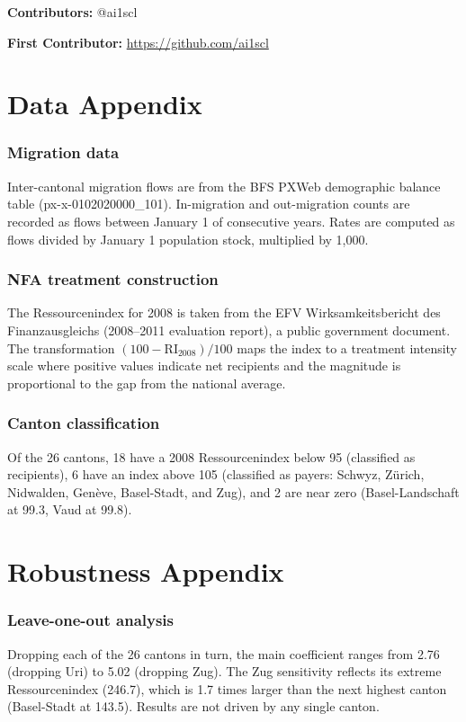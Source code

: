 \documentclass[12pt]{article}
\begin{document}
\noindent\textbf{Contributors:} @ai1scl

\noindent\textbf{First Contributor:} \url{https://github.com/ai1scl}

\label{apep_main_text_end}
\newpage


\newpage
\appendix

\section{Data Appendix}

\subsubsection*{Migration data} Inter-cantonal migration flows are from the BFS PXWeb demographic balance table (px-x-0102020000\_101). In-migration and out-migration counts are recorded as flows between January 1 of consecutive years. Rates are computed as flows divided by January 1 population stock, multiplied by 1,000.

\subsubsection*{NFA treatment construction} The Ressourcenindex for 2008 is taken from the EFV Wirksamkeitsbericht des Finanzausgleichs (2008--2011 evaluation report), a public government document. The transformation $(100 - \text{RI}_{2008}) / 100$ maps the index to a treatment intensity scale where positive values indicate net recipients and the magnitude is proportional to the gap from the national average.

\subsubsection*{Canton classification} Of the 26 cantons, 18 have a 2008 Ressourcenindex below 95 (classified as recipients), 6 have an index above 105 (classified as payers: Schwyz, Z{\"u}rich, Nidwalden, Gen{\`e}ve, Basel-Stadt, and Zug), and 2 are near zero (Basel-Landschaft at 99.3, Vaud at 99.8).

\section{Robustness Appendix}

\subsubsection*{Leave-one-out analysis} Dropping each of the 26 cantons in turn, the main coefficient ranges from 2.76 (dropping Uri) to 5.02 (dropping Zug). The Zug sensitivity reflects its extreme Ressourcenindex (246.7), which is 1.7 times larger than the next highest canton (Basel-Stadt at 143.5). Results are not driven by any single canton.
\end{document}
